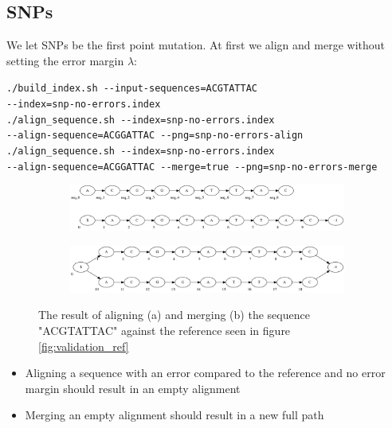 \documentclass[thesis.tex]{subfiles}
\begin{document}
\subsection*{SNPs}
We let SNPs be the first point mutation. At first we align and merge without setting the error margin $\lambda$:\\
\par\noindent
\texttt{./build\_index.sh -{}-input-sequences=ACGTATTAC\\
-{}-index=snp-no-errors.index}\\
\texttt{./align\_sequence.sh -{}-index=snp-no-errors.index\\
-{}-align-sequence=ACGGATTAC -{}-png=snp-no-errors-align}\\
\texttt{./align\_sequence.sh -{}-index=snp-no-errors.index\\
-{}-align-sequence=ACGGATTAC -{}-merge=true -{}-png=snp-no-errors-merge}\\
\begin{figure}[!h]
  \begin{mdframed}
  \begin{subfigure}[t]{\textwidth}
      \includegraphics[width=\textwidth]{output/snp-no-errors-align.png}
    \subcaption{}
  \end{subfigure}
  \begin{subfigure}[t]{\textwidth}
      \includegraphics[width=\textwidth]{output/snp-no-errors-merge.png}
    \subcaption{}
  \end{subfigure}
  \end{mdframed}
  \caption{The result of aligning (a) and merging (b) the sequence "ACGTATTAC" against the reference seen in figure \ref{fig:validation_ref}}
  \label{fig:validation_snp_no_error}
\end{figure}
\begin{itemize}
\item Aligning a sequence with an error compared to the reference and no error margin should result in an empty alignment
\item Merging an empty alignment should result in a new full path
\end{itemize}
\end{document}
